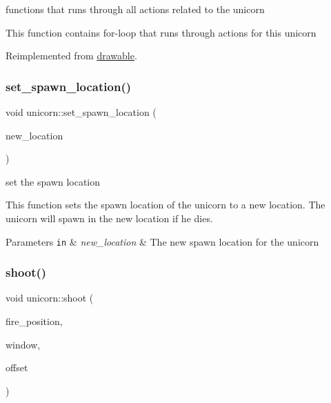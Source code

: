 functions that runs through all actions related to the unicorn 

This function contains for-\/loop that runs through actions for this unicorn 

Reimplemented from \hyperlink{classdrawable_a715df01a318331e5611a2b0ad30109ff}{drawable}.

\mbox{\label{classunicorn_af0e2581c426b4b1e32f8a7b484b4e242}} 
\subsubsection{\texorpdfstring{set\+\_\+spawn\+\_\+location()}{set\_spawn\_location()}}
{\footnotesize\ttfamily void unicorn\+::set\+\_\+spawn\+\_\+location (\begin{DoxyParamCaption}\item[{sf\+::\+Vector2f}]{new\+\_\+location }\end{DoxyParamCaption})}



set the spawn location 

This function sets the spawn location of the unicorn to a new location. The unicorn will spawn in the new location if he dies.


\begin{DoxyParams}[1]{Parameters}
\mbox{\tt in}  & {\em new\+\_\+location} & The new spawn location for the unicorn \\
\hline
\end{DoxyParams}
\mbox{\label{classunicorn_af448a3fa5fc5f09254b50afa151ce42b}} 
\subsubsection{\texorpdfstring{shoot()}{shoot()}}
{\footnotesize\ttfamily void unicorn\+::shoot (\begin{DoxyParamCaption}\item[{sf\+::\+Vector2f}]{fire\+\_\+position,  }\item[{sf\+::\+Render\+Window \&}]{window,  }\item[{sf\+::\+Vector2f}]{offset }\end{DoxyParamCaption})}



